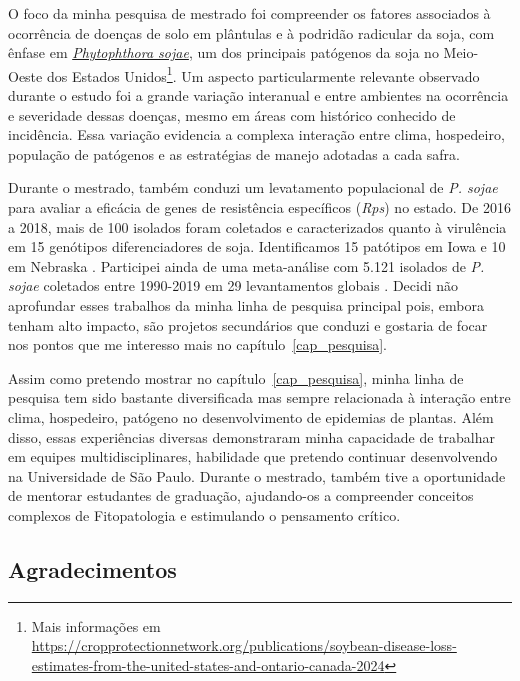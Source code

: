 \documentclass[12pt,a4paper,oneside]{book}
\newcommand{\USP}{Universidade de São Paulo}
\begin{document}
O foco da minha pesquisa de mestrado foi compreender os fatores associados à ocorrência de 
doenças de solo em plântulas e à podridão radicular da soja, com ênfase em \href{https://en.wikipedia.org/wiki/Phytophthora_sojae}{\textit{Phytophthora sojae}}, um dos principais 
patógenos da soja no Meio-Oeste dos Estados Unidos\footnote{Mais informações em \url{https://cropprotectionnetwork.org/publications/soybean-disease-loss-estimates-from-the-united-states-and-ontario-canada-2024}}.
Um aspecto particularmente relevante observado durante o estudo foi a grande variação interanual e entre ambientes na ocorrência e severidade dessas doenças, mesmo em áreas com histórico conhecido de incidência. 
Essa variação evidencia a complexa interação entre clima, hospedeiro, população de patógenos e as estratégias de manejo adotadas a cada safra.

Durante o mestrado, também conduzi um levatamento populacional de \textit{P. sojae} para avaliar a eficácia de 
genes de resistência específicos (\textit{Rps}) no estado. De 2016 a 2018, mais de 100 isolados foram coletados e caracterizados quanto 
à virulência em 15 genótipos diferenciadores de soja. Identificamos 15 patótipos em Iowa e 10 em Nebraska \citep{Matthiesen2021}. 
Participei ainda de uma meta-análise com 5.121 isolados de \textit{P. sojae} coletados entre 1990-2019 em 29 
levantamentos globais \citep{McCoy2023}. Decidi não aprofundar esses trabalhos da minha linha de pesquisa principal pois, embora tenham alto impacto,
são projetos secundários que conduzi e gostaria de focar nos pontos que me interesso mais no capítulo~\ref{cap_pesquisa}.

Assim como pretendo mostrar no capítulo~\ref{cap_pesquisa}, minha linha de pesquisa tem sido bastante diversificada mas sempre relacionada à 
interação entre clima, hospedeiro, patógeno no desenvolvimento de epidemias de plantas. Além disso, essas experiências diversas 
demonstraram minha capacidade de trabalhar em equipes multidisciplinares, habilidade que pretendo continuar desenvolvendo na \USP{}. Durante o mestrado, 
também tive a oportunidade de mentorar estudantes de graduação, ajudando-os a compreender conceitos complexos de Fitopatologia e estimulando o pensamento crítico.

\subsection{Agradecimentos}
\end{document}
